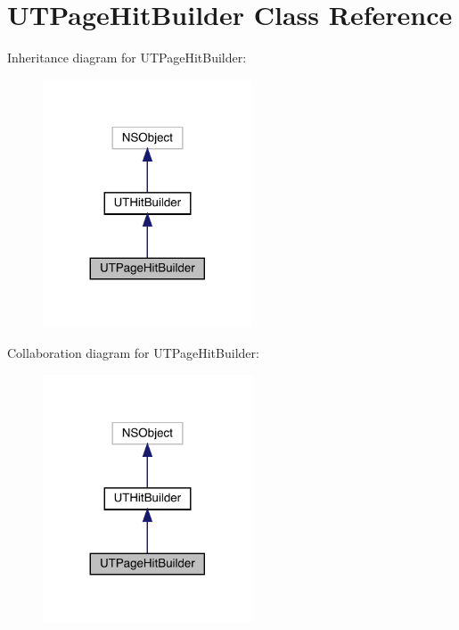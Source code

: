 \hypertarget{interface_u_t_page_hit_builder}{}\section{U\+T\+Page\+Hit\+Builder Class Reference}
\label{interface_u_t_page_hit_builder}


Inheritance diagram for U\+T\+Page\+Hit\+Builder\+:\nopagebreak
\begin{figure}[H]
\begin{center}
\leavevmode
\includegraphics[width=176pt]{interface_u_t_page_hit_builder__inherit__graph}
\end{center}
\end{figure}


Collaboration diagram for U\+T\+Page\+Hit\+Builder\+:\nopagebreak
\begin{figure}[H]
\begin{center}
\leavevmode
\includegraphics[width=176pt]{interface_u_t_page_hit_builder__coll__graph}
\end{center}
\end{figure}
